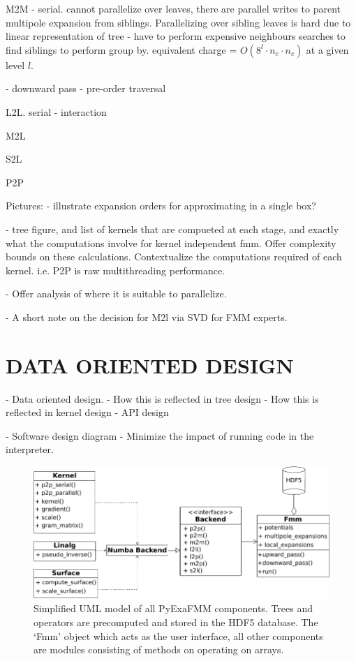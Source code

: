 \documentclass{IEEEcsmag}
\begin{document}
M2M
- serial. cannot parallelize over leaves, there are parallel writes to parent multipole expansion from siblings. Parallelizing over sibling leaves is hard due to linear representation of tree - have to perform expensive neighbours searches to find siblings to perform group by. equivalent charge = $O(8^l \cdot n_e \cdot n_c)$ at a given level $l$.

- downward pass - pre-order traversal

L2L. serial - interaction

M2L

S2L

P2P

Pictures:
- illustrate expansion orders for approximating in a single box?

- tree figure, and list of kernels that are compueted at each stage, and exactly what the computations involve for kernel independent fmm. Offer complexity bounds on these calculations. Contextualize the computations required of each kernel. i.e. P2P is raw multithreading performance.

- Offer analysis of where it is suitable to parallelize.

- A short note on the decision for M2l via SVD for FMM experts.

\section{DATA ORIENTED DESIGN}

- Data oriented design.
- How this is reflected in tree design
- How this is reflected in kernel design
- API design

- Software design diagram
- Minimize the impact of running code in the interpreter.

\begin{figure}
    \centerline{\includegraphics {figures/software.pdf}}
    \caption{Simplified UML model of all PyExaFMM components. Trees and operators are precomputed and stored in the HDF5 database. The `Fmm' object which acts as the user interface, all other components are modules consisting of methods on operating on arrays.}
    \label{fig:design}
\end{figure}
\end{document}
